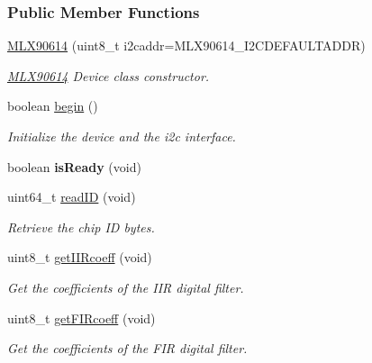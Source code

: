 \subsubsection*{Public Member Functions}
\begin{DoxyCompactItemize}
\item 
\mbox{\hyperlink{class_m_l_x90614_abd5039fd7e21e82db9f0cf2575f0d23a}{M\+L\+X90614}} (uint8\+\_\+t i2caddr=M\+L\+X90614\+\_\+\+I2\+C\+D\+E\+F\+A\+U\+L\+T\+A\+D\+DR)
\begin{DoxyCompactList}\small\item\em \mbox{\hyperlink{class_m_l_x90614}{M\+L\+X90614}} Device class constructor. \end{DoxyCompactList}\item 
\mbox{\label{class_m_l_x90614_ade3c27bfa8ff06c043e2c83743e38b5c}} 
boolean \mbox{\hyperlink{class_m_l_x90614_ade3c27bfa8ff06c043e2c83743e38b5c}{begin}} ()
\begin{DoxyCompactList}\small\item\em Initialize the device and the i2c interface. \end{DoxyCompactList}\item 
\mbox{\label{class_m_l_x90614_a3fa540d984b00a7c062be1b3e84bd881}} 
boolean {\bfseries is\+Ready} (void)
\item 
uint64\+\_\+t \mbox{\hyperlink{class_m_l_x90614_a352cc543f3e417d6318b6152d872db2e}{read\+ID}} (void)
\begin{DoxyCompactList}\small\item\em Retrieve the chip ID bytes. \end{DoxyCompactList}\item 
uint8\+\_\+t \mbox{\hyperlink{class_m_l_x90614_ac04578d67760dd73df4ed023d9b97896}{get\+I\+I\+Rcoeff}} (void)
\begin{DoxyCompactList}\small\item\em Get the coefficients of the I\+IR digital filter. \end{DoxyCompactList}\item 
uint8\+\_\+t \mbox{\hyperlink{class_m_l_x90614_a8b50c1957a50c7dda5767fe881a7fa95}{get\+F\+I\+Rcoeff}} (void)
\begin{DoxyCompactList}\small\item\em Get the coefficients of the F\+IR digital filter. \end{DoxyCompactList}\item 

\end{DoxyCompactItemize}
